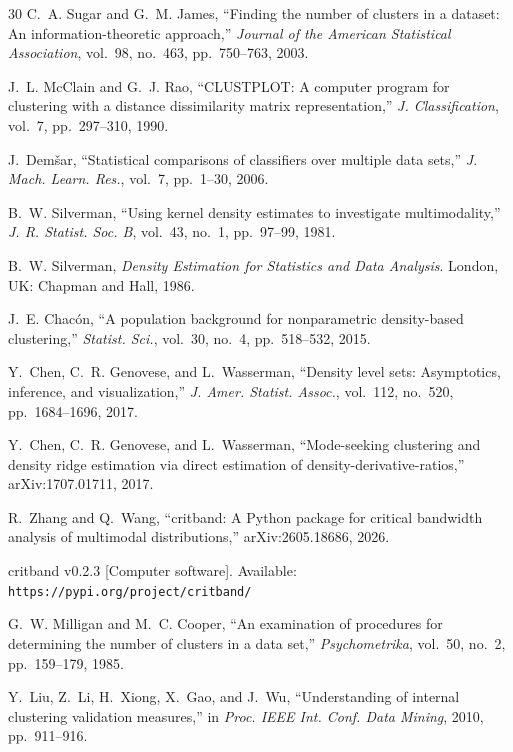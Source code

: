 \documentclass[journal]{IEEEtran}
\begin{document}
\begin{thebibliography}{30}
C.~A. Sugar and G.~M. James, ``Finding the number of clusters in a dataset: An information-theoretic approach,'' \textit{Journal of the American Statistical Association}, vol.~98, no.~463, pp.~750--763, 2003.

J.~L. McClain and G.~J. Rao, ``CLUSTPLOT: A computer program for clustering with a distance dissimilarity matrix representation,'' \textit{J. Classification}, vol.~7, pp.~297--310, 1990.

J.~Dem\v{s}ar, ``Statistical comparisons of classifiers over multiple data sets,'' \textit{J. Mach. Learn. Res.}, vol.~7, pp.~1--30, 2006.

B.~W. Silverman, ``Using kernel density estimates to investigate multimodality,'' \textit{J. R. Statist. Soc. B}, vol.~43, no.~1, pp.~97--99, 1981.

B.~W. Silverman, \textit{Density Estimation for Statistics and Data Analysis}. London, UK: Chapman and Hall, 1986.

J.~E. Chac\'on, ``A population background for nonparametric density-based clustering,'' \textit{Statist. Sci.}, vol.~30, no.~4, pp.~518--532, 2015.

Y.~Chen, C.~R. Genovese, and L.~Wasserman, ``Density level sets: Asymptotics, inference, and visualization,'' \textit{J. Amer. Statist. Assoc.}, vol.~112, no.~520, pp.~1684--1696, 2017.

Y.~Chen, C.~R. Genovese, and L.~Wasserman, ``Mode-seeking clustering and density ridge estimation via direct estimation of density-derivative-ratios,'' arXiv:1707.01711, 2017.

R.~Zhang and Q.~Wang, ``critband: A Python package for critical bandwidth analysis of multimodal distributions,'' arXiv:2605.18686, 2026.

critband v0.2.3 [Computer software]. Available: \texttt{https://pypi.org/project/critband/}

G.~W. Milligan and M.~C. Cooper, ``An examination of procedures for determining the number of clusters in a data set,'' \textit{Psychometrika}, vol.~50, no.~2, pp.~159--179, 1985.

Y.~Liu, Z.~Li, H.~Xiong, X.~Gao, and J.~Wu, ``Understanding of internal clustering validation measures,'' in \textit{Proc. IEEE Int. Conf. Data Mining}, 2010, pp.~911--916.


\end{thebibliography}
\end{document}
